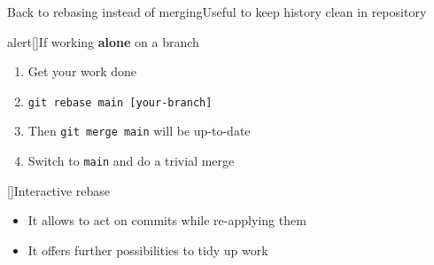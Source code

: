 \documentclass[usenames,svgnames,14pt]{beamer}
\begin{document}
\begin{frame}{Back to rebasing instead of merging}{Useful to keep history clean in repository}
    \begin{varblock}{alert}[\textwidth]{If working \textbf{alone} on a branch}
        \begin{enumerate}
            \item Get your work done
            \item \texttt{git rebase main [your-branch]}
            \item Then \;\texttt{git merge main}\; will be up-to-date
            \item Switch to \;\texttt{main}\; and do a trivial merge
        \end{enumerate}
    \end{varblock}
    \begin{varblock}{}[\textwidth]{Interactive rebase}
        \begin{itemize}
            \item It allows to act on commits while re-applying them
            \item It offers further possibilities to tidy up work
        \end{itemize}
    \end{varblock}
\end{frame}
\end{document}

